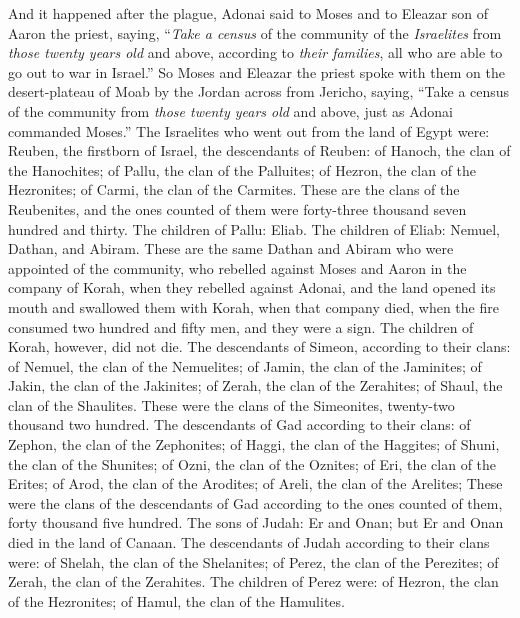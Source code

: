 \begin{biblechapter} %
  And it happened after the plague, Adonai said to Moses and to Eleazar son of Aaron the priest, saying,
\verse “\textit{Take a census} of the community of the \textit{Israelites} from \textit{those twenty years old} and above, according to \textit{their families}, all who are able to go out to war in Israel.”
\verse So Moses and Eleazar the priest spoke with them on the desert-plateau of Moab by the Jordan across from Jericho, saying,
\verse “Take a census of the community from \textit{those twenty years old} and above, just as Adonai commanded Moses.” The Israelites who went out from the land of Egypt were:
\verse Reuben, the firstborn of Israel, the descendants of Reuben: of Hanoch, the clan of the Hanochites; of Pallu, the clan of the Palluites;
\verse of Hezron, the clan of the Hezronites; of Carmi, the clan of the Carmites.
\verse These are the clans of the Reubenites, and the ones counted of them were forty-three thousand seven hundred and thirty.
\verse The children of Pallu: Eliab.
\verse The children of Eliab: Nemuel, Dathan, and Abiram. These are the same Dathan and Abiram who were appointed of the community, who rebelled against Moses and Aaron in the company of Korah, when they rebelled against Adonai,
\verse and the land opened its mouth and swallowed them with Korah, when that company died, when the fire consumed two hundred and fifty men, and they were a sign.
\verse The children of Korah, however, did not die.
\verse The descendants of Simeon, according to their clans: of Nemuel, the clan of the Nemuelites; of Jamin, the clan of the Jaminites; of Jakin, the clan of the Jakinites;
\verse of Zerah, the clan of the Zerahites; of Shaul, the clan of the Shaulites.
\verse These were the clans of the Simeonites, twenty-two thousand two hundred.
\verse The descendants of Gad according to their clans: of Zephon, the clan of the Zephonites; of Haggi, the clan of the Haggites; of Shuni, the clan of the Shunites;
\verse of Ozni, the clan of the Oznites; of Eri, the clan of the Erites;
\verse of Arod, the clan of the Arodites; of Areli, the clan of the Arelites;
\verse These were the clans of the descendants of Gad according to the ones counted of them, forty thousand five hundred.
\verse The sons of Judah: Er and Onan; but Er and Onan died in the land of Canaan.
\verse The descendants of Judah according to their clans were: of Shelah, the clan of the Shelanites; of Perez, the clan of the Perezites; of Zerah, the clan of the Zerahites.
\verse The children of Perez were: of Hezron, the clan of the Hezronites; of Hamul, the clan of the Hamulites.

\end{biblechapter}
